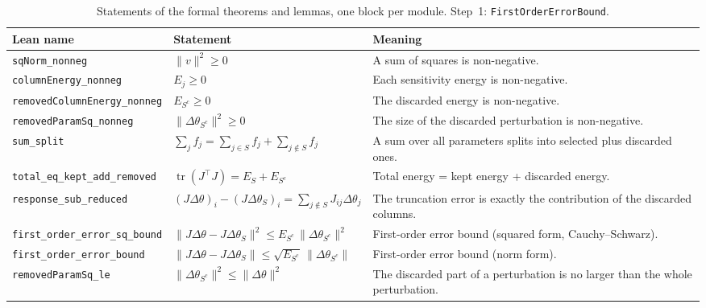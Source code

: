 {\small
\begin{longtable}{@{}>{\raggedright\arraybackslash}p{3.6cm}>{\raggedright\arraybackslash}p{6.6cm}>{\raggedright\arraybackslash}p{5.6cm}@{}}
\caption{Statements of the formal theorems and lemmas, one block per module. Step~1: \texttt{FirstOrderErrorBound}.}\label{tab:statements}\\
\toprule
Lean name & Statement & Meaning \\
\midrule
\endhead
\texttt{sqNorm\_\allowbreak{}nonneg} & $\displaystyle \|v\|^2\ge 0$ & A sum of squares is non-negative. \\[3pt]
\texttt{columnEnergy\_\allowbreak{}nonneg} & $\displaystyle E_j\ge 0$ & Each sensitivity energy is non-negative. \\[3pt]
\texttt{removedColumnEnergy\_\allowbreak{}nonneg} & $\displaystyle E_{S^c}\ge 0$ & The discarded energy is non-negative. \\[3pt]
\texttt{removedParamSq\_\allowbreak{}nonneg} & $\displaystyle \|\Delta\theta_{S^c}\|^2\ge 0$ & The size of the discarded perturbation is non-negative. \\[3pt]
\texttt{sum\_\allowbreak{}split} & $\displaystyle \sum_{j}f_j=\sum_{j\in S}f_j+\sum_{j\notin S}f_j$ & A sum over all parameters splits into selected plus discarded ones. \\[3pt]
\texttt{total\_\allowbreak{}eq\_\allowbreak{}kept\_\allowbreak{}add\_\allowbreak{}removed} & $\displaystyle \operatorname{tr}(J^\top J)=E_S+E_{S^c}$ & Total energy = kept energy + discarded energy. \\[3pt]
\texttt{response\_\allowbreak{}sub\_\allowbreak{}reduced} & $\displaystyle (J\Delta\theta)_i-(J\Delta\theta_S)_i=\sum_{j\notin S}J_{ij}\Delta\theta_j$ & The truncation error is exactly the contribution of the discarded columns. \\[3pt]
\texttt{first\_\allowbreak{}order\_\allowbreak{}error\_\allowbreak{}sq\_\allowbreak{}bound} & $\displaystyle \|J\Delta\theta-J\Delta\theta_S\|^2\le E_{S^c}\,\|\Delta\theta_{S^c}\|^2$ & First-order error bound (squared form, Cauchy--Schwarz). \\[3pt]
\texttt{first\_\allowbreak{}order\_\allowbreak{}error\_\allowbreak{}bound} & $\displaystyle \|J\Delta\theta-J\Delta\theta_S\|\le\sqrt{E_{S^c}}\,\|\Delta\theta_{S^c}\|$ & First-order error bound (norm form). \\[3pt]
\texttt{removedParamSq\_\allowbreak{}le} & $\displaystyle \|\Delta\theta_{S^c}\|^2\le\|\Delta\theta\|^2$ & The discarded part of a perturbation is no larger than the whole perturbation. \\[3pt]

\end{longtable}}
